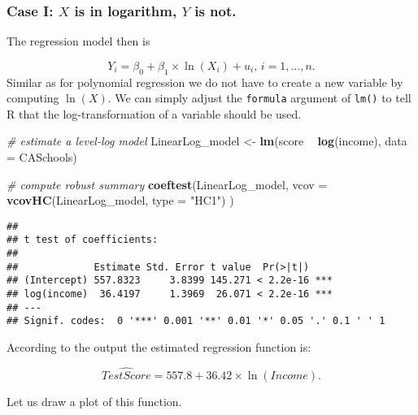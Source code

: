 \documentclass[]{book}
\newenvironment{Shaded}{\begin{snugshade}}{\end{snugshade}}
\newcommand{\KeywordTok}[1]{\textcolor[rgb]{0.13,0.29,0.53}{\textbf{#1}}}
\newcommand{\DataTypeTok}[1]{\textcolor[rgb]{0.13,0.29,0.53}{#1}}
\newcommand{\StringTok}[1]{\textcolor[rgb]{0.31,0.60,0.02}{#1}}
\newcommand{\CommentTok}[1]{\textcolor[rgb]{0.56,0.35,0.01}{\textit{#1}}}
\newcommand{\OperatorTok}[1]{\textcolor[rgb]{0.81,0.36,0.00}{\textbf{#1}}}
\newcommand{\NormalTok}[1]{#1}
\theoremstyle{definition}
\theoremstyle{definition}
\theoremstyle{definition}
\theoremstyle{remark}
\begin{document}
\subsubsection*{\texorpdfstring{Case I: \(X\) is in logarithm, \(Y\) is
not.}{Case I: X is in logarithm, Y is not.}}\label{case-i-x-is-in-logarithm-y-is-not.}

The regression model then is

\[Y_i = \beta_0 + \beta_1 \times \ln(X_i) + u_i \text{, } i=1,...,n. \]
Similar as for polynomial regression we do not have to create a new
variable by computing \(\ln(X)\). We can simply adjust the
\texttt{formula} argument of \texttt{lm()} to tell R that the
log-transformation of a variable should be used.

\begin{Shaded}
\begin{Highlighting}[]
\CommentTok{# estimate a level-log model}
\NormalTok{LinearLog_model <-}\StringTok{ }\KeywordTok{lm}\NormalTok{(score }\OperatorTok{~}\StringTok{ }\KeywordTok{log}\NormalTok{(income), }\DataTypeTok{data =}\NormalTok{ CASchools)}

\CommentTok{# compute robust summary}
\KeywordTok{coeftest}\NormalTok{(LinearLog_model, }
         \DataTypeTok{vcov =} \KeywordTok{vcovHC}\NormalTok{(LinearLog_model, }\DataTypeTok{type =} \StringTok{"HC1"}\NormalTok{)}
\NormalTok{         )}
\end{Highlighting}
\end{Shaded}

\begin{verbatim}
## 
## t test of coefficients:
## 
##             Estimate Std. Error t value  Pr(>|t|)    
## (Intercept) 557.8323     3.8399 145.271 < 2.2e-16 ***
## log(income)  36.4197     1.3969  26.071 < 2.2e-16 ***
## ---
## Signif. codes:  0 '***' 0.001 '**' 0.01 '*' 0.05 '.' 0.1 ' ' 1
\end{verbatim}

According to the output the estimated regression function is:

\[\widehat{TestScore} = 557.8 + 36.42 \times \ln(Income).\]

Let us draw a plot of this function.
\end{document}
